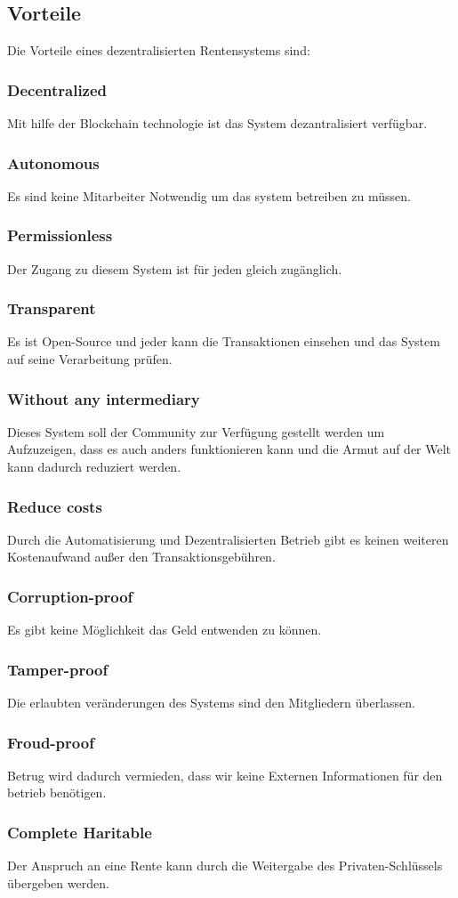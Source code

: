 \subsection{Vorteile}

Die Vorteile eines dezentralisierten Rentensystems sind:

\subsubsection*{Decentralized}
Mit hilfe der Blockchain technologie ist das System dezantralisiert verfügbar.
\subsubsection*{Autonomous}
Es sind keine Mitarbeiter Notwendig um das system betreiben zu müssen.
\subsubsection*{Permissionless}
Der Zugang zu diesem System ist für jeden gleich zugänglich.
\subsubsection*{Transparent}
Es ist Open-Source und jeder kann die Transaktionen einsehen und das System auf seine Verarbeitung prüfen.
\subsubsection*{Without any intermediary}
Dieses System soll der Community zur Verfügung gestellt werden um Aufzuzeigen, dass es auch anders funktionieren kann und die Armut auf der Welt kann dadurch reduziert werden.
\subsubsection*{Reduce costs}
Durch die Automatisierung und Dezentralisierten Betrieb gibt es keinen weiteren Kostenaufwand außer den Transaktionsgebühren.
\subsubsection*{Corruption-proof}
Es gibt keine Möglichkeit das Geld entwenden zu können.
\subsubsection*{Tamper-proof}
Die erlaubten veränderungen des Systems sind den Mitgliedern überlassen.
\subsubsection*{Froud-proof}
Betrug wird dadurch vermieden, dass wir keine Externen Informationen für den betrieb benötigen.
\subsubsection*{Complete Haritable}
Der Anspruch an eine Rente kann durch die Weitergabe des Privaten-Schlüssels übergeben werden.
